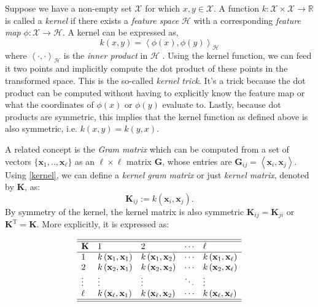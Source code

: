 Suppose we have a non-empty set  $\mathcal{X}$ for which $x,y \in \mathcal{X}$. A function $k: \mathcal{X} \times \mathcal{X} \rightarrow \mathbb{R}$ is called a \textit{kernel} if there exists a \textit{feature space} $ \mathcal{H}$ with a corresponding \textit{feature map} $\phi: \mathcal{X} \rightarrow \mathcal{H}$. A kernel can be expressed as,
\begin{equation}
\label{kernel}
k(x,y) = \left\langle \phi(x), \phi(y) \right\rangle_\mathcal{H}
\end{equation}
where $\left\langle \cdot, \cdot \right\rangle_\mathcal{H}$ is the \textit{inner product} in $ \mathcal{H}$  \cite{scholkopf2002learning}. Using the kernel function, we can feed it two points and implicitly compute the dot product of these points in the transformed space. This is the so-called \textit{kernel trick}. It's a trick because the dot product can be computed without having to explicitly know the feature map or what the coordinates of $\phi(x)$ or $\phi(y)$ evaluate to. Lastly, because dot products are symmetric, this implies that the kernel function as defined above is also symmetric, i.e. $k(x, y) = k(y, x)$.

A related concept is the \textit{Gram matrix} which can be computed from a set of vectors $\{\mathbf{x}_1,..,\mathbf{x}_{\ell}\}$ as an $\ell \times \ell$ matrix $\mathbf{G}$, whose entries are $\mathbf{G}_{ij} = \left\langle \mathbf{x}_i, \mathbf{x}_j \right\rangle$. Using \ref{kernel}, we can define a \textit{kernel gram matrix} or just \textit{kernel matrix}, denoted by $\mathbf{K}$, as:
\begin{equation}
\mathbf{K}_{ij} := k(\mathbf{x}_i, \mathbf{x}_j ).
\end{equation}
By symmetry of the kernel, the kernel matrix is also symmetric $\mathbf{K}_{ij}=\mathbf{K}_{ji}$ or $\mathbf{K}^\text{T} = \mathbf{K}$. More explicitly, it is expressed as:

\begin{equation}
\begin{array}{lllll}
\hline \hline \mathbf{K} & 1 & 2 & \cdots & \ell \\
\hline 1 & k \left(\mathbf{x}_{1}, \mathbf{x}_{1}\right) & k\left(\mathbf{x}_{1}, \mathbf{x}_{2}\right) & \cdots & k
\left(\mathbf{x}_{1}, \mathbf{x}_{\ell}\right) \\
2 & k\left(\mathbf{x}_{2}, \mathbf{x}_{1}\right) & k\left(\mathbf{x}_{2}, \mathbf{x}_{2}\right) & \cdots & k\left(\mathbf{x}_{2}, \mathbf{x}_{\ell}\right) \\
\vdots & \vdots & \vdots & \ddots & \vdots \\
\ell & k\left(\mathbf{x}_{\ell}, \mathbf{x}_{1}\right) & k\left(\mathbf{x}_{\ell}, \mathbf{x}_{2}\right) & \cdots & k \left(\mathbf{x}_{\ell}, \mathbf{x}_{\ell}\right) \\
\hline \hline
\end{array}
\end{equation}

